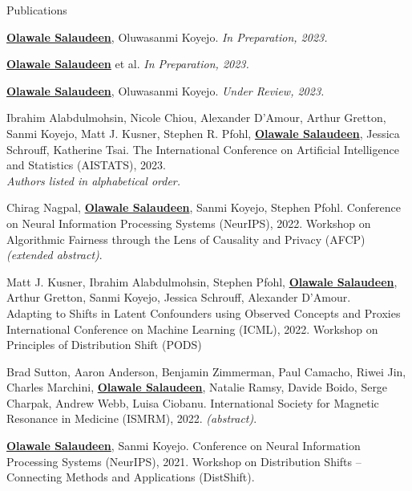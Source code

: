 \documentclass[11pt]{resume} %
\begin{document}
\begin{rSection}{Publications}
\begin{etaremune}

\item \textbf{\underline{Olawale Salaudeen}}, Oluwasanmi Koyejo.
\emph{In Preparation, 2023.}

\item \textbf{\underline{Olawale Salaudeen}} et al.
\emph{In Preparation, 2023.}

\item \textbf{\underline{Olawale Salaudeen}}, Oluwasanmi Koyejo.
\emph{Under Review, 2023.}

\item Ibrahim Alabdulmohsin, Nicole Chiou, Alexander D'Amour, Arthur Gretton, 
Sanmi Koyejo, Matt J. Kusner, Stephen R. Pfohl, 
\textbf{\underline{Olawale Salaudeen}}, Jessica Schrouff, Katherine Tsai. 
The International Conference on Artificial Intelligence and Statistics (AISTATS), 2023.\\ 
\emph{Authors listed in alphabetical order.}

\item Chirag Nagpal, \textbf{\underline{Olawale Salaudeen}}, Sanmi Koyejo, Stephen
Pfohl.
Conference on Neural Information Processing Systems (NeurIPS), 2022. Workshop
on Algorithmic Fairness through the Lens of Causality and Privacy (AFCP) 
\emph{(extended abstract)}.

\item Matt J. Kusner, Ibrahim Alabdulmohsin, Stephen Pfohl, \textbf{\underline{Olawale Salaudeen}},
Arthur Gretton, Sanmi Koyejo, Jessica Schrouff, Alexander D’Amour.\\
Adapting to Shifts in Latent Confounders using Observed Concepts and Proxies
International Conference on Machine Learning (ICML), 2022. Workshop on Principles of Distribution Shift (PODS)

\item Brad Sutton, Aaron Anderson, Benjamin Zimmerman, Paul Camacho, Riwei Jin, Charles Marchini,
\textbf{\underline{Olawale Salaudeen}}, Natalie Ramsy, Davide Boido, Serge
Charpak, Andrew Webb, Luisa Ciobanu. 
International Society for Magnetic Resonance in Medicine (ISMRM), 2022. \emph{(abstract)}.

\item \textbf{\underline{Olawale Salaudeen}}, Sanmi Koyejo. 
Conference on Neural Information Processing Systems (NeurIPS), 2021. Workshop on Distribution Shifts -- Connecting Methods and Applications (DistShift).
\end{etaremune}
\end{rSection}
\end{document}
